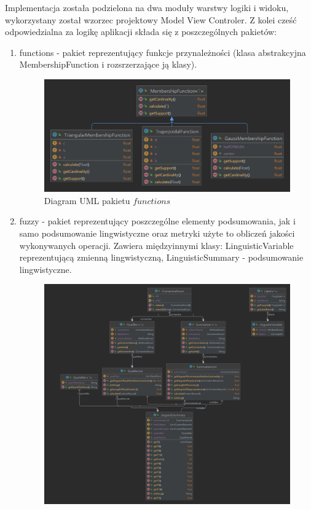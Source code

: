 \documentclass{classrep}
\begin{document}
Implementacja została podzielona na dwa moduły warstwy logiki i widoku, wykorzystany został wzorzec projektowy Model View Controler. Z kolei cześć odpowiedzialna za logikę aplikacji składa się z poszczególnych pakietów:
\begin{enumerate}
  \item functions - pakiet reprezentujący funkcje przynależności (klasa abstrakcyjna MembershipFunction i rozsrzerzające ją klasy). 
  \begin{figure}[H]
    \centering
    \includegraphics[scale = 0.2]{fun}
    \caption{Diagram UML pakietu \(functions\)}
  \end{figure}
  \item fuzzy - pakiet reprezentujący poszczególne elementy podsumowania, jak i samo podsumowanie lingwistyczne oraz metryki użyte to obliczeń jakości wykonywanych operacji. Zawiera międzyinnymi klasy: LinguisticVariable reprezentującą zmienną lingwistyczną, LinguisticSummary - podsumowanie lingwistyczne.
  \begin{figure}[H]    
    \centering
    \includegraphics[scale = 0.16]{fuzzy}

\end{figure}
\end{enumerate}
\end{document}
